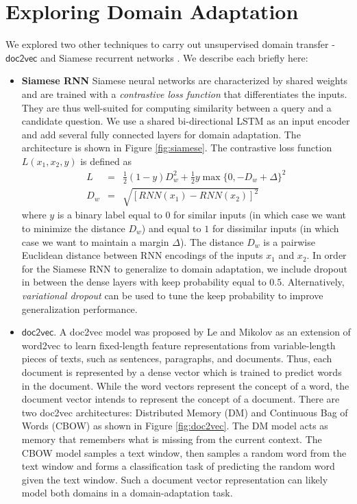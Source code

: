 \documentclass{sigkddExp}
\begin{document}
\section{Exploring Domain Adaptation}
\label{other_techniques}
We explored two other techniques to carry out unsupervised domain transfer - $\textsf{doc2vec}$ \cite{doc2vec1} and Siamese recurrent networks \cite{siamese}. We describe each briefly here:
\begin{itemize}[topsep=0pt,itemsep=-1ex,partopsep=1ex,parsep=1ex]

\item \textbf{Siamese RNN} 
 Siamese neural networks \cite{siamese} are characterized by shared weights and are trained with a \textit{contrastive loss function} that differentiates the inputs. They are thus well-suited for computing similarity between a query and a candidate question. We use a shared bi-directional LSTM as an input encoder and add several fully connected layers for domain adaptation. The architecture is shown in Figure \ref{fig:siamese}. The contrastive loss function $L(x_1,x_2,y)$ is defined as
\begin{eqnarray}
L &=& \frac{1}{2}(1-y)D_{w}^{2} + \frac{1}{2}y \max \{0, -D_w + \Delta\}^{2} \\
D_w &=& \sqrt{[RNN(x_1) - RNN(x_2)]^2}
\end{eqnarray}
where $y$ is a binary label equal to $0$ for similar inputs (in which case we want to minimize the distance $D_w$) and equal to $1$ for dissimilar inputs (in which case we want to maintain a margin $\Delta$). The distance $D_w$ is a pairwise Euclidean distance between RNN encodings of the inputs $x_1$ and $x_2$. In order for the Siamese RNN to generalize to domain adaptation, we include dropout\cite{srivastava2014dropout} in between the dense layers with keep probability equal to $0.5$. Alternatively, \textit{variational dropout}\cite{kingma2015variational} can be used to tune the keep probability to improve generalization performance.

\item $\textsf{doc2vec}$. A \textsf{doc2vec} model was proposed by Le and Mikolov \cite{doc2vec1} as an extension of word2vec to learn fixed-length feature representations from variable-length pieces of texts, such as sentences, paragraphs, and documents. Thus, each document is represented by a dense vector which is trained to predict words in the document. While the word vectors represent the concept of a word, the document vector intends to represent the concept of a document. There are two doc2vec architectures: Distributed Memory (DM) and Continuous Bag of Words (CBOW) as shown in Figure \ref{fig:doc2vec}. The DM model acts as memory that remembers what is missing from the current context. The CBOW model samples a text window, then samples a random word from the text window and forms a classification task of predicting the random word given the text window. Such a document vector representation can likely model both domains in a domain-adaptation task.
\end{itemize}
\end{document}

